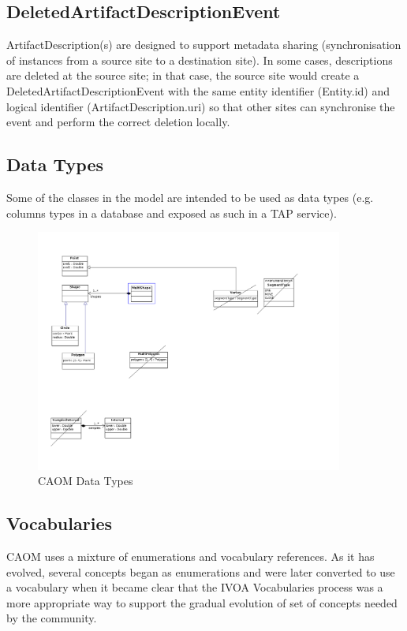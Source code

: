 \documentclass[11pt,a4paper]{ivoa}
\begin{document}
\subsection{DeletedArtifactDescriptionEvent}

ArtifactDescription(s) are designed to support metadata sharing (synchronisation of instances
from a source site to a destination site). In some cases, descriptions are deleted at the 
source site; in that case, the source site would create a DeletedArtifactDescriptionEvent with 
the same entity identifier (Entity.id) and logical identifier (ArtifactDescription.uri) so that 
other sites can synchronise the event and perform the correct deletion locally.

\subsection{Data Types}
Some of the classes in the model are intended to be used as data types (e.g. columns
types in a database and exposed as such in a TAP service).

\begin{figure}
\centering
\includegraphics[width=0.9\textwidth]{src/uml/CAOM2datatypes.png}
\caption{CAOM Data Types}
\label{fig:datatypes}
\end{figure}

\subsection{Vocabularies}

CAOM uses a mixture of enumerations and vocabulary references. As it has evolved,
several concepts began as enumerations and were later converted to use a vocabulary
when it became clear that the IVOA Vocabularies process was a more appropriate way
to support the gradual evolution of set of concepts needed by the community.
\end{document}
